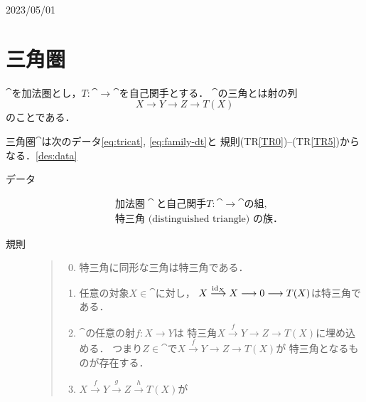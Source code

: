 
\newpage
{\Large{2023/05/01}}
\section{三角圏}\label{ssec:tricat}
$\cat$を加法圏とし，$T\colon\cat\to\cat$を自己関手とする．
$\cat$の三角とは射の列
\begin{equation*}
    X\to Y\to Z\to T(X)
\end{equation*}
のことである．

\begin{Definition}
    三角圏$\cat$は次のデータ\eqref{eq:tricat}, \eqref{eq:family-dt}と
    規則(TR\ref{TR0})--(TR\ref{TR5})からなる．\ref{des:data}
    \begin{description}
        \item[データ] \begin{align}
            \text{加法圏}\cat\text{と自己関手}T\colon\cat\to\cat\text{の組},\label{eq:tricat}\\
            \text{特三角 (distinguished triangle) の族．}\label{eq:family-dt}
        \end{align}    
        \item[規則] \label{des:data}
        \begin{quote}
            \begin{enumerate}
                \setcounter{enumi}{-1}
                \renewcommand{\labelenumi}{(TR{\arabic{enumi}})}
                \item 特三角に同形な三角は特三角である．\label{TR0}
                \item 任意の対象$X\in\cat$に対し，
                    $X\overset{\mathop{\mathrm{id}}\nolimits_X}{\longrightarrow}X\longrightarrow
                    0\longrightarrow T(X)$は特三角である．\label{TR1}
                \item $\cat$の任意の射$f\colon X\to Y$は
                    特三角$X\overset{f}{\to}Y\to Z\to T(X)$に埋め込める．
                    つまり$Z\in\cat$で$X\overset{f}{\to}Y\to Z\to T(X)$が
                    特三角となるものが存在する．\label{TR2}
                \item $X\overset{f}{\to}
                    Y\overset{g}{\to} 
                    Z\overset{h}{\to} T(X)$が

\end{enumerate}
\end{quote}
\end{description}
\end{Definition}
